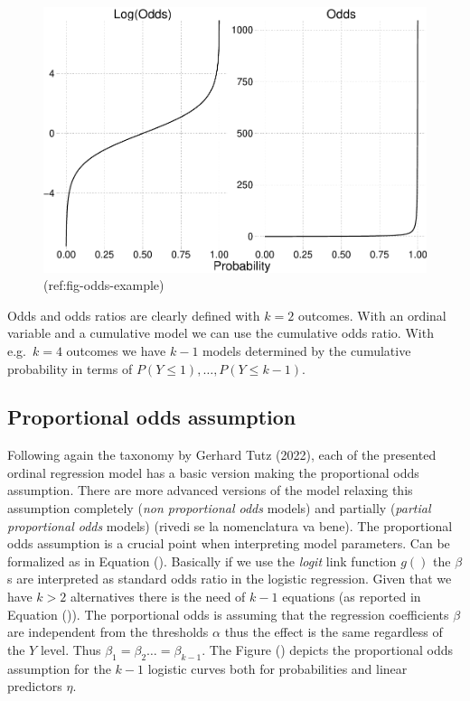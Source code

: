 \documentclass[
  man,floatsintext]{apa6}
\begin{document}
\scriptsize

\begin{figure}

{\centering \includegraphics{paper-new_files/figure-latex/fig-odds-example-1} 

}

\caption{(ref:fig-odds-example)}\label{fig:fig-odds-example}
\end{figure}

\normalsize

Odds and odds ratios are clearly defined with \(k = 2\) outcomes. With an ordinal variable and a cumulative model we can use the cumulative odds ratio. With e.g.~\(k = 4\) outcomes we have \(k - 1\) models determined by the cumulative probability in terms of \(P(Y \leq 1), \dots, P(Y \leq k - 1)\).

\subsection{Proportional odds assumption}\label{proportional-odds-assumption}

Following again the taxonomy by Gerhard Tutz (2022), each of the presented ordinal regression model has a basic version making the proportional odds assumption. There are more advanced versions of the model relaxing this assumption completely (\emph{non proportional odds} models) and partially (\emph{partial proportional odds} models) (rivedi se la nomenclatura va bene). The proportional odds assumption is a crucial point when interpreting model parameters. Can be formalized as in Equation (). Basically if we use the \emph{logit} link function \(g()\) the \(\beta\)s are interpreted as standard odds ratio in the logistic regression. Given that we have \(k > 2\) alternatives there is the need of \(k - 1\) equations (as reported in Equation ()). The porportional odds is assuming that the regression coefficients \(\beta\) are independent from the thresholds \(\alpha\) thus the effect is the same regardless of the \(Y\) level. Thus \(\beta_1 = \beta_2 \dots = \beta_{k - 1}\). The Figure () depicts the proportional odds assumption for the \(k - 1\) logistic curves both for probabilities and linear predictors \(\eta\).
\end{document}
